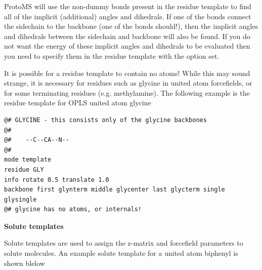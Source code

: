 \documentclass[letterpaper,10pt,english]{manual}
\begin{document}
ProtoMS will use the non-dummy bonds present in the residue template to find all of the implicit (additional) angles and dihedrals. If one of the bonds connect the sidechain to the backbone (one of the bonds should!), then the implicit angles and dihedrals between the sidechain and backbone will also be found. If you do not want the energy of these implicit angles and dihedrals to be evaluated then you need to specify them in the residue template with the  option set.

It is possible for a residue template to contain no atoms! While this may sound strange, it is necessary for residues such as glycine in united atom forcefields, or for some terminating residues (e.g. methylamine). The following example is the residue template for OPLS united atom glycine

\begin{Verbatim}[commandchars=@\[\]]
@# GLYCINE - this consists only of the glycine backbones
@#
@#    --C--CA--N--
@#
mode template
residue GLY
info rotate 0.5 translate 1.0
backbone first glynterm middle glycenter last glycterm single glysingle
@# glycine has no atoms, or internals!
\end{Verbatim}

\textbf{Solute templates}

Solute templates are used to assign the z-matrix and forcefield parameters to solute molecules. An example solute template for a united atom biphenyl is shown blelow
\end{document}
